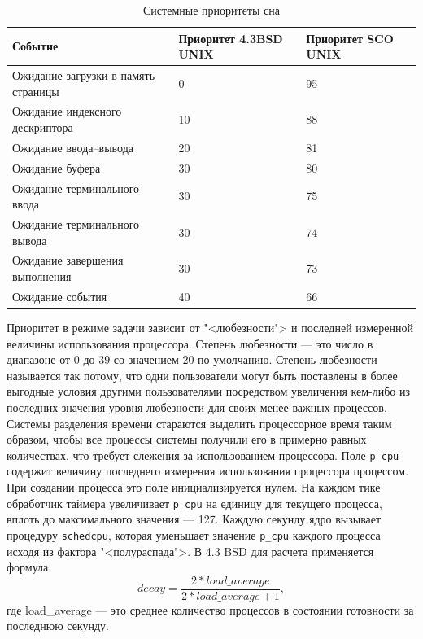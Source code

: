 \documentclass[a4paper,oneside,14pt]{extreport}
\newcommand{\code}[1]{\texttt{#1}}
\begin{document}
	\begin{table}[H]
		\begin{center}
			\begin{tabular}{|l|p{65pt}|p{65pt}|} 
				\hline
				{Событие} & {Приоритет 4.3BSD UNIX} & {Приоритет SCO UNIX}\\
				\hline
				{Ожидание загрузки в память страницы} & 0 & 95\\
				\hline
				{Ожидание индексного дескриптора} & 10 & 88\\
				\hline
				{Ожидание ввода--вывода} & 20 & 81 \\
				\hline
				{Ожидание буфера} & 30 & 80\\
				\hline
				{Ожидание терминального ввода} & 30 & 75\\
				\hline
				{Ожидание терминального вывода} & 30 & 74\\
				\hline
				{Ожидание завершения выполнения} & 30 & 73\\
				\hline
				{Ожидание события} & 40 & 66\\
				\hline
			\end{tabular}
		\end{center}
		\caption{Системные приоритеты сна}
		\label{tbl:sleeppriority}
	\end{table}
	Приоритет в режиме задачи зависит от "<любезности"> и последней измеренной величины использования процессора. Степень любезности --- это число в диапазоне от 0 до 39 со значением 20 по умолчанию. Степень любезности называется так потому, что одни пользователи могут быть поставлены в более выгодные условия другими пользователями посредством увеличения кем-либо из последних значения уровня любезности для своих менее важных процессов.
	Системы разделения времени стараются выделить процессорное время таким образом, чтобы все процессы системы получили его в примерно равных количествах, что требует слежения за использованием процессора. Поле \code{p{\_}cpu} содержит величину последнего измерения использования процессора процессом. При создании процесса это поле инициализируется нулем. На каждом тике обработчик таймера увеличивает \code{p{\_}cpu} на единицу для текущего процесса, вплоть до максимального значения --- 127. Каждую секунду ядро вызывает процедуру \code{schedcpu}, которая уменьшает значение \code{p{\_}cpu} каждого процесса исходя из фактора "<полураспада">. В 4.3 BSD для расчета применяется формула
	\[
	decay = \frac{2*load{\_}average}{2*load{\_}average + 1},
	\]
	где load{\_}average --- это среднее количество процессов в состоянии готовности за последнюю секунду.
\end{document}
